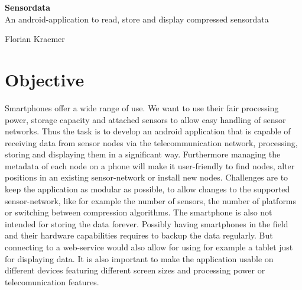 \documentclass[11pt,oneside,a4paper]{scrartcl}
\begin{document}
\vspace*{1cm}
\pagestyle{fancy}
\fancyhf{}
\fancyhead[LO]{\today}
\renewcommand{\headrulewidth}{0.5pt}
\renewcommand{\footrulewidth}{0.5pt}
\addtolength{\headheight}{30pt}



\vspace*{2cm}
\begin{center}
\vspace*{0.5cm}
\textbf{\Huge Sensordata}
\vspace*{2cm}
\\ An android-application to read, store and display compressed sensordata\\
\end{center}

\vspace*{3cm}

\begin{center}
\textbf{\LARGE} Florian Kraemer \\
\end{center}

\newpage %

\tableofcontents

\newpage

\setcounter{page}{1}
\pagestyle{fancy}
\fancyhf{}
\renewcommand{\headrulewidth}{0.5pt}
\fancyfoot[C]{\thepage}
\renewcommand{\footrulewidth}{0.5pt}

\onehalfspacing
\setcounter{section}{0}

\section{Objective}
Smartphones offer a wide range of use. We want to use their fair processing power, storage capacity and attached sensors to allow easy handling of sensor networks. Thus the task is to develop an android application that is capable of receiving data from sensor nodes via the telecommunication network, processing, storing and displaying them in a significant way. Furthermore managing the metadata of each node on a phone will make it user-friendly to find nodes, alter positions in an existing sensor-network or install new nodes. Challenges are to keep the application as modular as possible, to allow changes to the supported sensor-network, like for example the number of sensors, the number of platforms or switching between compression algorithms. The smartphone is also not intended for storing the data forever. Possibly having smartphones in the field and their hardware capabilities requires to backup the data regularly. But connecting to a web-service would also allow for using for example a tablet just for displaying data. It is also important to make the application usable on different devices featuring different screen sizes and processing power or telecomunication features.
\end{document}
